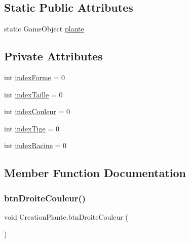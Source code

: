 \subsection*{Static Public Attributes}
\begin{DoxyCompactItemize}
\item 
static Game\+Object \mbox{\hyperlink{class_creation_plante_a34c60783a4a885ebf9a1ab71401891ac}{plante}}
\end{DoxyCompactItemize}
\subsection*{Private Attributes}
\begin{DoxyCompactItemize}
\item 
int \mbox{\hyperlink{class_creation_plante_ae113e4a18684b63ca49d7c05c35dcd45}{index\+Forme}} = 0
\item 
int \mbox{\hyperlink{class_creation_plante_a5ce6babdea40ad05337aa662b6b3d2ef}{index\+Taille}} = 0
\item 
int \mbox{\hyperlink{class_creation_plante_ae227d3a64d78322a275183f2343837e5}{index\+Couleur}} = 0
\item 
int \mbox{\hyperlink{class_creation_plante_aec7ba86f678fccc0dd38f77fbfd8b93d}{index\+Tige}} = 0
\item 
int \mbox{\hyperlink{class_creation_plante_abe2ab891c9ab78e1805b2ceb45dfb77f}{index\+Racine}} = 0
\end{DoxyCompactItemize}


\subsection{Member Function Documentation}
\mbox{\label{class_creation_plante_ab027a3f0d94171786ef9c3f23ac6dd0d}} 
\subsubsection{\texorpdfstring{btn\+Droite\+Couleur()}{btnDroiteCouleur()}}
{\footnotesize\ttfamily void Creation\+Plante.\+btn\+Droite\+Couleur (\begin{DoxyParamCaption}{ }\end{DoxyParamCaption})\hspace{0.3cm}{\ttfamily [inline]}}

